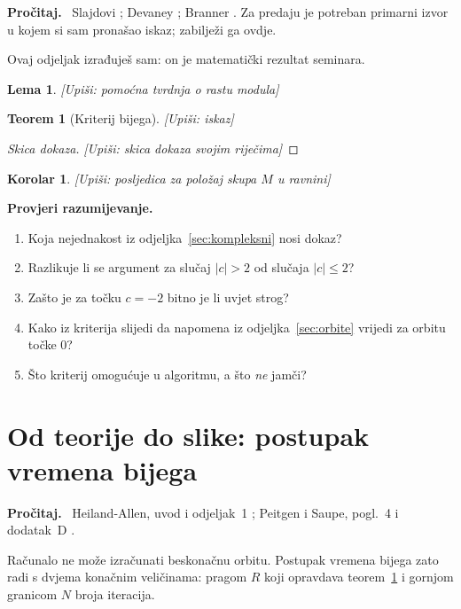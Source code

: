 \documentclass[11pt,a4paper]{article}
\theoremstyle{definition}
\theoremstyle{plain}
\newtheorem{teorem}[definicija]{Teorem}
\newtheorem{lema}[definicija]{Lema}
\newtheorem{korolar}[definicija]{Korolar}
\newenvironment{citaj}
  {\par\medskip\noindent\textbf{\color{blue!60!black}Pročitaj.}\ }
  {\par\medskip}
\newenvironment{pitanja}
  {\par\noindent\textbf{\color{orange!70!black}Provjeri razumijevanje.}
   \begin{enumerate}[label=\arabic*., nosep]}
  {\end{enumerate}\medskip}
\newcommand{\upisi}[1]{{\color{gray}\itshape [Upiši: #1]}}
\begin{document}
\begin{citaj}
Slajdovi \cite{rosehulman_julia}; Devaney \cite{devaney_first_course};
Branner \cite{branner1989}. Za predaju je potreban primarni izvor u kojem si
sam pronašao iskaz; zabilježi ga ovdje.
\end{citaj}

Ovaj odjeljak izrađuješ sam: on je matematički rezultat seminara.

\begin{lema}
\upisi{pomoćna tvrdnja o rastu modula}
\end{lema}

\begin{teorem}[Kriterij bijega]
\label{tm:kriterij}
\upisi{iskaz}
\end{teorem}

\begin{proof}[Skica dokaza]
\upisi{skica dokaza svojim riječima}
\end{proof}

\begin{korolar}
\upisi{posljedica za položaj skupa $M$ u ravnini}
\end{korolar}

\begin{pitanja}
  \item Koja nejednakost iz odjeljka~\ref{sec:kompleksni} nosi dokaz?
  \item Razlikuje li se argument za slučaj $|c| > 2$ od slučaja $|c| \le 2$?
  \item Zašto je za točku $c = -2$ bitno je li uvjet strog?
  \item Kako iz kriterija slijedi da napomena iz odjeljka~\ref{sec:orbite}
        vrijedi za orbitu točke $0$?
  \item Što kriterij omogućuje u algoritmu, a što \emph{ne} jamči?
\end{pitanja}

\section{Od teorije do slike: postupak vremena bijega}
\label{sec:escape}

\begin{citaj}
Heiland-Allen, uvod i odjeljak~1 \cite{heilandallen_escape}; Peitgen i Saupe,
pogl.~4 i dodatak~D \cite{peitgen_saupe1988}.
\end{citaj}

Računalo ne može izračunati beskonačnu orbitu. Postupak vremena bijega zato
radi s dvjema konačnim veličinama: pragom $R$ koji opravdava
teorem~\ref{tm:kriterij} i gornjom granicom $N$ broja iteracija.
\end{document}
